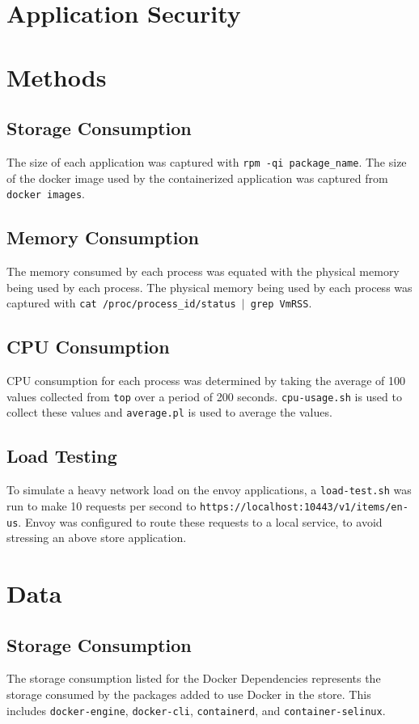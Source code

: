 \documentclass{article}
\begin{document}
\section{Application Security}

\section{Methods}
\subsection{Storage Consumption}
The size of each application was captured with \texttt{rpm -qi package\_name}. The size of the docker image used by the containerized application was captured from \texttt{docker images}.

\subsection{Memory Consumption}
The memory consumed by each process was equated with the physical memory being used by each process. The physical memory being used by each process was captured with \texttt{cat /proc/process\_id/status $|$ grep VmRSS}.

\subsection{CPU Consumption}
CPU consumption for each process was determined by taking the average of 100 values collected from \texttt{top} over a period of 200 seconds. \texttt{cpu-usage.sh} is used to collect these values and \texttt{average.pl} is used to average the values.

\subsection{Load Testing}
To simulate a heavy network load on the envoy applications, a \texttt{load-test.sh} was run to make 10 requests per second to \texttt{https://localhost:10443/v1/items/en-us}. Envoy was configured to route these requests to a local service, to avoid stressing an above store application.

\section{Data}
\subsection{Storage Consumption}
The storage consumption listed for the Docker Dependencies represents the storage consumed by the packages added to use Docker in the store. This includes \texttt{docker-engine}, \texttt{docker-cli}, \texttt{containerd}, and \texttt{container-selinux}.
\end{document}
